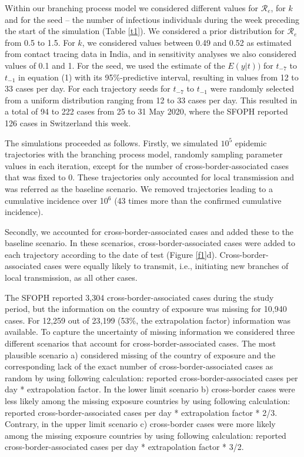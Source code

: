 \documentclass[10pt, a4paper, twoside]{article}
\begin{document}
\begin{multicols}{2}
Within our branching process model we considered different values for $\mathcal{R}_e$, for $k$ and for the seed -- the number of infectious individuals during the week preceding the start of the simulation (Table \ref{t1}).
We considered a prior distribution for $\mathcal{R}_e$ from 0.5 to 1.5.
For $k$, we considered values between 0.49 and 0.52 as estimated from contact tracing data in India\cite{laxminarayan_epidemiology_2020}, and in sensitivity analyses we also considered values of 0.1 and 1.\cite{taube_open-access_2021}
For the seed, we used the estimate of the $E(y|t))$ for $t_{-7}$ to $t_{-1}$ in equation (1) with its 95\%-predictive interval, resulting in values from 12 to 33 cases per day.
For each trajectory seeds for $t_{-7}$ to $t_{-1}$  were randomly selected from a uniform distribution ranging from 12 to 33 cases per day.
This resulted in a total of 94 to 222 cases from 25 to 31 May 2020, where the SFOPH reported 126 cases in Switzerland this week.

The simulations proceeded as follows.
Firstly, we simulated $10^5$ epidemic trajectories with the branching process model, randomly sampling parameter values in each iteration, except for the number of cross-border-associated cases that was fixed to 0.
These trajectories only accounted for local transmission and was referred as the baseline scenario.
We removed trajectories leading to a cumulative incidence over 10$^6$ (43 times more than the confirmed cumulative incidence).

Secondly, we accounted for cross-border-associated cases and added these to the baseline scenario.
In these scenarios, cross-border-associated cases were added to each trajectory according to the date of test (Figure \ref{f1}d).
Cross-border-associated cases were equally likely to transmit, i.e., initiating new branches of local transmission, as all other cases.

The SFOPH reported 3,304 cross-border-associated cases during the study period, but the information on the country of exposure was missing for 10,940 cases.
For 12,259 out of 23,199 (53\%, the extrapolation factor) information was available.
To capture the uncertainty of missing information we considered three different scenarios that account for cross-border-associated cases.
The most plausible scenario a) considered missing of the country of exposure and the corresponding lack of the exact number of cross-border-associated cases as random by using following calculation: reported cross-border-associated cases per day * extrapolation factor.
In the lower limit scenario b) cross-border cases were less likely among the missing exposure countries by using following calculation: reported cross-border-associated cases per day * extrapolation factor * 2/3.
Contrary, in the upper limit scenario c) cross-border cases were more likely among the missing exposure countries by using following calculation: reported cross-border-associated cases per day * extrapolation factor * 3/2.

\end{multicols}
\end{document}
